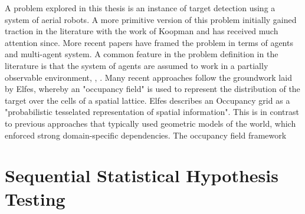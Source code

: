 \workinprogress

A problem explored in this thesis is an instance of target detection using a system of aerial robots. A more primitive version of this problem initially gained traction in the literature with the work of Koopman \cite{KoopmanTheoryOfSearchTargetDetection} and has received much attention since. More recent papers have framed the problem in terms of agents and multi-agent system. %
A common feature in the problem definition in the literature is that the system of agents are assumed to work in a partially observable environment\cite{Symington2010ProbabilisticUAVs}, \cite{Chung2008Multi-agentFramework}, \cite{WongMulti-vehicleTargets}. Many recent approaches follow the groundwork laid by Elfes\cite{ElfesUsingNavigation}, whereby an "occupancy field" is used to represent the distribution of the target over the cells of a spatial lattice. Elfes describes an Occupancy grid as a "probabilistic tesselated representation of spatial information". This is in contrast to previous approaches that typically used geometric models of the world, which enforced strong domain-specific dependencies. The occupancy field framework 
\par



\section{Sequential Statistical Hypothesis Testing}

